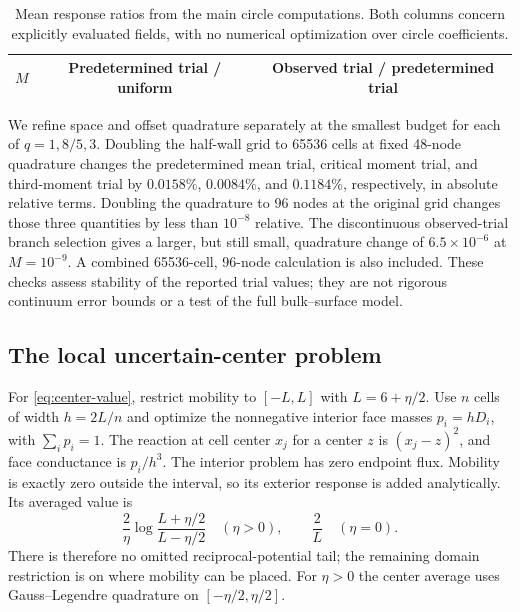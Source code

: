 \begin{table}[t]
\centering
\caption{Mean response ratios from the main circle computations.
Both columns concern explicitly evaluated fields, with no numerical
optimization over circle coefficients.}
\label{tab:mean-trials}
\begin{tabular}{@{}ccc@{}}
\toprule
$M$ & Predetermined trial / uniform & Observed trial / predetermined trial\\
\midrule

\end{tabular}
\end{table}

We refine space and offset quadrature separately at the smallest
budget for each of $q=1,8/5,3$. Doubling the half-wall grid to
65536 cells at fixed 48-node quadrature changes the predetermined
mean trial, critical moment trial, and third-moment trial by
$0.0158\%$, $0.0084\%$, and $0.1184\%$, respectively, in absolute
relative terms. Doubling the quadrature to 96 nodes at the original
grid changes those three quantities by less than $10^{-8}$ relative.
The discontinuous observed-trial branch selection gives a larger,
but still small, quadrature change of $6.5\times10^{-6}$ at
$M=10^{-9}$. A combined 65536-cell, 96-node calculation is also
included. These checks assess stability of the reported trial
values; they are not rigorous continuum error bounds or a test of
the full bulk--surface model.

\subsection{The local uncertain-center problem}
For \eqref{eq:center-value}, restrict mobility to $[-L,L]$ with
$L=6+\eta/2$. Use $n$ cells of width $h=2L/n$ and optimize the
nonnegative interior face masses $p_i=hD_i$, with $\sum_i p_i=1$.
The reaction at cell center $x_j$ for a center $z$ is
$(x_j-z)^2$, and face conductance is $p_i/h^3$.
The interior problem has zero endpoint flux. Mobility is exactly
zero outside the interval, so its exterior response is added
analytically. Its averaged value is
\begin{equation}\label{eq:numeric-exterior}
 \frac2\eta\log\frac{L+\eta/2}{L-\eta/2}\quad(\eta>0),
       \qquad \frac2L\quad(\eta=0).
\end{equation}
There is therefore no omitted reciprocal-potential tail; the
remaining domain restriction is on where mobility can be placed.
For $\eta>0$ the center average uses Gauss--Legendre quadrature
on $[-\eta/2,\eta/2]$.

